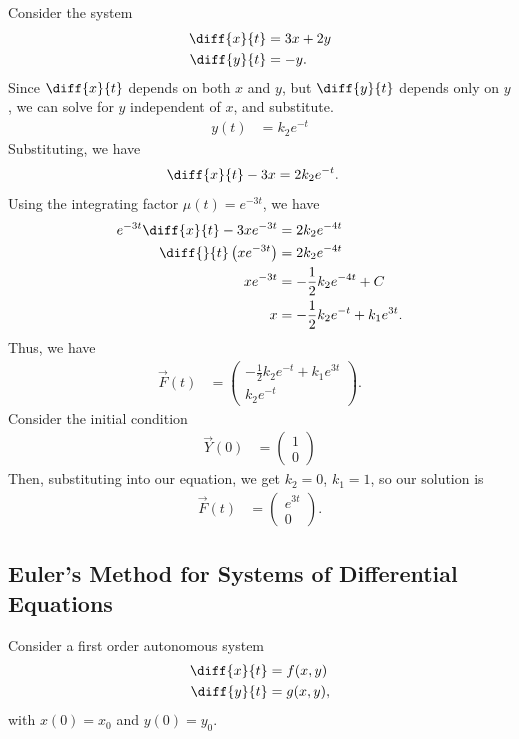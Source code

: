 \documentclass[10pt]{mypackage}
\begin{document}
\begin{example}
Consider the system
\begin{align*}
  \diff{x}{t} &= 3x + 2y\\
  \diff{y}{t} &= -y.
\end{align*}
Since $\diff{x}{t}$ depends on both $x$ and $y$, but $\diff{y}{t}$ depends only on $y$, we can solve for $y$ independent of $x$, and substitute.
\begin{align*}
  y(t) &= k_2e^{-t}
\end{align*}
Substituting, we have
\begin{align*}
  \diff{x}{t} - 3x &= 2k_2e^{-t}.
\end{align*}
Using the integrating factor $\mu(t) = e^{-3t}$, we have
\begin{align*}
  e^{-3t}\diff{x}{t} - 3xe^{-3t} &= 2k_2e^{-4t}\\
  \diff{}{t}\left(xe^{-3t}\right) &= 2k_2e^{-4t}\\
  xe^{-3t} &= -\frac{1}{2}k_2e^{-4t} + C\\
  x &= -\frac{1}{2}k_2e^{-t} + k_1e^{3t}.
\end{align*}
Thus, we have
\begin{align*}
  \vec{F}(t) &= \begin{pmatrix}-\frac{1}{2}k_2e^{-t} + k_1e^{3t} \\ k_2e^{-t}\end{pmatrix}.
\end{align*}
Consider the initial condition
\begin{align*}
  \vec{Y}(0) &= \begin{pmatrix}1 \\ 0\end{pmatrix}
\end{align*}
Then, substituting into our equation, we get $k_2 = 0$, $k_1 = 1$, so our solution is
\begin{align*}
  \vec{F}(t) &= \begin{pmatrix}e^{3t}\\0\end{pmatrix}.
\end{align*}
\end{example}
\subsection{Euler's Method for Systems of Differential Equations}%
Consider a first order autonomous system
\begin{align*}
\diff{x}{t} &= f(x,y)\\
\diff{y}{t} &= g(x,y),
\end{align*}
with $x(0) = x_0$ and $y(0) = y_0$.\newline
\end{document}
